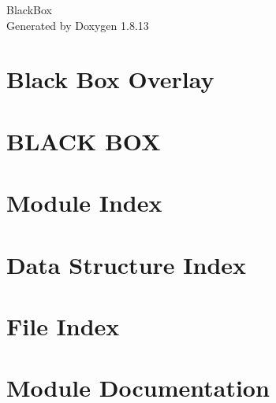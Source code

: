 \documentclass[twoside]{book}
\newcommand{\+}{\discretionary{\mbox{\scriptsize$\hookleftarrow$}}{}{}}
\newcommand{\clearemptydoublepage}{%
  \newpage{\pagestyle{empty}\cleardoublepage}%
}
\begin{document}
\begin{titlepage}
\vspace*{7cm}
\begin{center}%
{\Large Black\+Box }\\
\vspace*{1cm}
{\large Generated by Doxygen 1.8.13}\\
\end{center}
\end{titlepage}
\clearemptydoublepage
{}
\tableofcontents
\clearemptydoublepage
{}

\chapter{Black Box Overlay}
\label{md___users_jselfridge__documents__git_hub__black_box_dto__r_e_a_d_m_e}

\chapter{B\+L\+A\+CK B\+OX}
\label{md___users_jselfridge__documents__git_hub__black_box__r_e_a_d_m_e}

\chapter{Module Index}

\chapter{Data Structure Index}

\chapter{File Index}

\chapter{Module Documentation}

\end{document}

